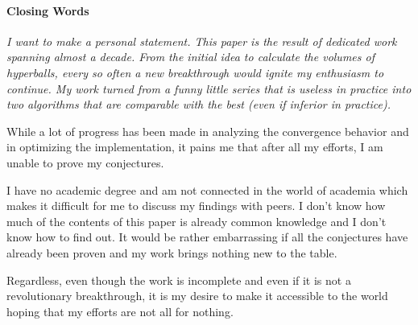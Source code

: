 \documentclass[a4paper,11pt]{scrartcl}
\theoremstyle{definition}
\theoremstyle{plain}
\theoremstyle{remark}
\begin{document}
\paragraph*{Closing Words}
{
\itshape
I want to make a personal statement.
This paper is the result of dedicated work spanning almost a decade.
From the initial idea to calculate the volumes of hyperballs, every so often a new breakthrough would ignite my enthusiasm to continue.
My work turned from a funny little series that is useless in practice into two algorithms that are comparable with the best (even if inferior in practice).

While a lot of progress has been made in analyzing the convergence behavior and in optimizing the implementation, it pains me that after all my efforts, I am unable to prove my conjectures.

I have no academic degree and am not connected in the world of academia which makes it difficult for me to discuss my findings with peers.
I don't know how much of the contents of this paper is already common knowledge and I don't know how to find out.
It would be rather embarrassing if all the conjectures have already been proven and my work brings nothing new to the table.

Regardless, even though the work is incomplete and even if it is not a revolutionary breakthrough, it is my desire to make it accessible to the world hoping that my efforts are not all for nothing.
}
\end{document}
